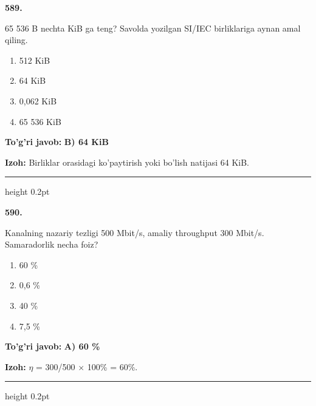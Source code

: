 \documentclass[10pt,a4paper,oneside]{article}
\begin{document}
\noindent\textbf{\color{ink}589.}
\par
65 536 B nechta KiB ga teng? Savolda yozilgan SI/IEC birliklariga aynan amal qiling.
\begin{enumerate}[label=\Alph*),leftmargin=9mm]
\item 512 KiB
\item 64 KiB
\item 0,062 KiB
\item 65 536 KiB
\end{enumerate}
\begin{tcolorbox}[enhanced,breakable,colback=teal!4,colframe=teal!50!black,boxrule=0.5pt,arc=1.1mm,left=3mm,right=3mm,top=1.7mm,bottom=1.7mm,before skip=2mm,after skip=2mm]
\textbf{\color{teal}To'g'ri javob:} \textbf{B) 64 KiB}
\par\smallskip
\textbf{Izoh:} Birliklar orasidagi ko'paytirish yoki bo'lish natijasi 64 KiB.
\end{tcolorbox}
\vspace{2mm}\hrule height 0.2pt \vspace{3mm}

\noindent\textbf{\color{ink}590.}
\par
Kanalning nazariy tezligi 500 Mbit/s, amaliy throughput 300 Mbit/s. Samaradorlik necha foiz?
\begin{enumerate}[label=\Alph*),leftmargin=9mm]
\item 60 \%
\item 0,6 \%
\item 40 \%
\item 7,5 \%
\end{enumerate}
\begin{tcolorbox}[enhanced,breakable,colback=teal!4,colframe=teal!50!black,boxrule=0.5pt,arc=1.1mm,left=3mm,right=3mm,top=1.7mm,bottom=1.7mm,before skip=2mm,after skip=2mm]
\textbf{\color{teal}To'g'ri javob:} \textbf{A) 60 \%}
\par\smallskip
\textbf{Izoh:} \ensuremath{\eta} = 300/500 \ensuremath{\times} 100\% = 60\%.
\end{tcolorbox}
\vspace{2mm}\hrule height 0.2pt \vspace{3mm}
\end{document}
